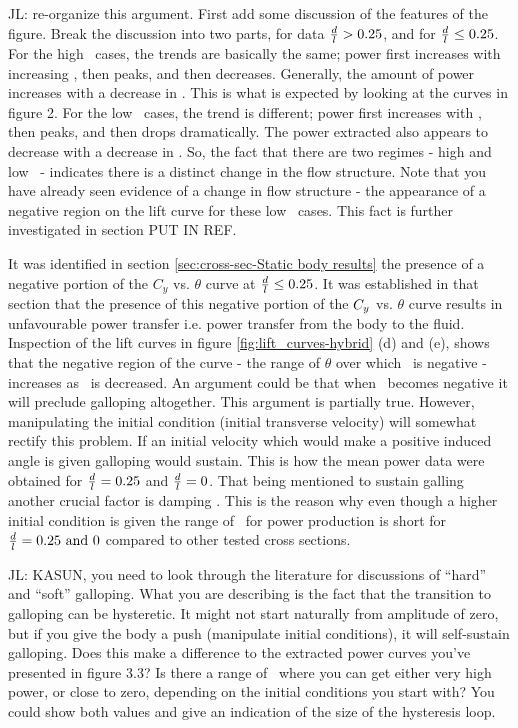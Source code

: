 JL: re-organize this argument. First add some discussion of the features of the figure. Break the discussion into two parts, for data $\frac{d}{l} > 0.25$, and for $\frac{d}{l} \leq 0.25$. For the high \ratio\ cases, the trends are basically the same; power first increases with increasing \massdamp, then peaks, and then decreases. Generally, the amount of power increases with a decrease in \ratio. This is what is expected by looking at the curves in figure 2. For the low \ratio\ cases, the trend is different; power first increases with \massdamp, then peaks, and then drops dramatically. The power extracted also appears to decrease with a decrease in \ratio. So, the fact that there are two regimes - high and low \ratio\ - indicates there is a distinct change in the flow structure. Note that you have already seen evidence of a change in flow structure - the appearance of a negative region on the lift curve for these low \ratio\ cases. This fact is further investigated in section PUT IN REF.
 
It was identified in section \ref{sec:cross-sec-Static body results} the presence of a negative portion of the $C_y$ vs. $\theta$ curve at $\frac{d}{l}\leq0.25$. It was established in that section that the presence of this negative portion of the $C_{y}$ vs. $\theta$ curve results in unfavourable power transfer i.e. power transfer from the body to the fluid. Inspection of the lift curves in figure \ref{fig:lift_curves-hybrid} (d) and (e), shows that the negative region of the curve - the range of $\theta$ over which \cy\ is negative - increases as \ratio\ is decreased. An argument could be that when \cy\ becomes negative it will preclude galloping altogether. This argument is partially true. However, manipulating the initial condition (initial transverse velocity) will somewhat rectify this problem. If an initial velocity which would make a positive induced angle is given galloping would sustain. This is how the mean power data were obtained for $\frac{d}{l}=0.25$ and $\frac{d}{l}=0$. That being mentioned to sustain galling another crucial factor is damping \citet{Paidoussis2010}. This is the reason why even though a higher initial condition is given the range of \massdamp\ for power production is short for $\ratio=0.25\ \text{and}\ 0$ compared to other tested cross sections. 

JL: KASUN, you need to look through the literature for discussions of ``hard'' and ``soft'' galloping. What you are describing is the fact that the transition to galloping can be hysteretic. It might not start naturally from amplitude of zero, but if you give the body a push (manipulate initial conditions), it will self-sustain galloping. Does this make a difference to the extracted power curves you've presented in figure 3.3? Is there a range of \massdamp\ where you can get either very high power, or close to zero, depending on the initial conditions you start with? You could show both values and give an indication of the size of the hysteresis loop.

